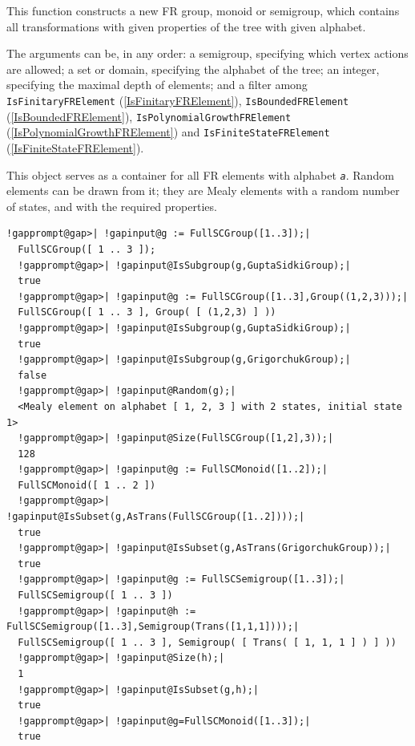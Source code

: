 \documentclass[a4paper,11pt]{report}
\begin{document}
{{{ This function constructs a new FR group, monoid or semigroup, which contains
all transformations with given properties of the tree with given alphabet. 

 The arguments can be, in any order: a semigroup, specifying which vertex
actions are allowed; a set or domain, specifying the alphabet of the tree; an
integer, specifying the maximal depth of elements; and a filter among \texttt{IsFinitaryFRElement} (\ref{IsFinitaryFRElement}), \texttt{IsBoundedFRElement} (\ref{IsBoundedFRElement}), \texttt{IsPolynomialGrowthFRElement} (\ref{IsPolynomialGrowthFRElement}) and \texttt{IsFiniteStateFRElement} (\ref{IsFiniteStateFRElement}). 

 This object serves as a container for all FR elements with alphabet \mbox{\texttt{\mdseries\slshape a}}. Random elements can be drawn from it; they are Mealy elements with a random
number of states, and with the required properties. 
\begin{Verbatim}[commandchars=!@|,fontsize=\small,frame=single,label=Example]
  !gapprompt@gap>| !gapinput@g := FullSCGroup([1..3]);|
  FullSCGroup([ 1 .. 3 ]);
  !gapprompt@gap>| !gapinput@IsSubgroup(g,GuptaSidkiGroup);|
  true
  !gapprompt@gap>| !gapinput@g := FullSCGroup([1..3],Group((1,2,3)));|
  FullSCGroup([ 1 .. 3 ], Group( [ (1,2,3) ] ))
  !gapprompt@gap>| !gapinput@IsSubgroup(g,GuptaSidkiGroup);|
  true
  !gapprompt@gap>| !gapinput@IsSubgroup(g,GrigorchukGroup);|
  false
  !gapprompt@gap>| !gapinput@Random(g);|
  <Mealy element on alphabet [ 1, 2, 3 ] with 2 states, initial state 1>
  !gapprompt@gap>| !gapinput@Size(FullSCGroup([1,2],3));|
  128
  !gapprompt@gap>| !gapinput@g := FullSCMonoid([1..2]);|
  FullSCMonoid([ 1 .. 2 ])
  !gapprompt@gap>| !gapinput@IsSubset(g,AsTrans(FullSCGroup([1..2])));|
  true
  !gapprompt@gap>| !gapinput@IsSubset(g,AsTrans(GrigorchukGroup));|
  true
  !gapprompt@gap>| !gapinput@g := FullSCSemigroup([1..3]);|
  FullSCSemigroup([ 1 .. 3 ])
  !gapprompt@gap>| !gapinput@h := FullSCSemigroup([1..3],Semigroup(Trans([1,1,1])));|
  FullSCSemigroup([ 1 .. 3 ], Semigroup( [ Trans( [ 1, 1, 1 ] ) ] ))
  !gapprompt@gap>| !gapinput@Size(h);|
  1
  !gapprompt@gap>| !gapinput@IsSubset(g,h);|
  true
  !gapprompt@gap>| !gapinput@g=FullSCMonoid([1..3]);|
  true
\end{Verbatim}
 }

 

}}
\end{document}
